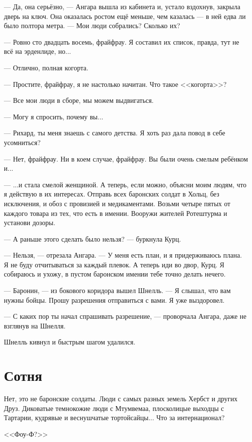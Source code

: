 --- Да, она серьёзно, --- Ангара вышла из кабинета и, устало вздохнув, закрыла дверь на ключ.
Она оказалась ростом ещё меньше, чем казалась --- в ней едва ли было полтора метра.
--- Мои люди собрались?
Сколько их?

--- Ровно сто двадцать восемь, фрайфрау.
Я составил их список, правда, тут не всё на эрденлиде, но...

--- Отлично, полная когорта.

--- Простите, фрайфрау, я не настолько начитан.
Что такое <<когорта>>?

--- Все мои люди в сборе, мы можем выдвигаться.

--- Могу я спросить, почему вы...

--- Рихард, ты меня знаешь с самого детства.
Я хоть раз дала повод в себе усомниться?

--- Нет, фрайфрау.
Ни в коем случае, фрайфрау.
Вы были очень смелым ребёнком и...

--- ...и стала смелой женщиной.
А теперь, если можно, объясни моим людям, что я действую в их интересах.
Отправь всех баронских солдат в Хольц, без исключения, и обоз с провизией и медикаментами.
Возьми четыре пятых от каждого товара из тех, что есть в имении.
Вооружи жителей Ротештурма и установи дозоры.

--- А раньше этого сделать было нельзя? --- буркнула Курц.

--- Нельзя, --- отрезала Ангара.
--- У меня есть план, и я придерживаюсь плана.
Я не буду отчитываться за каждый плевок.
А теперь иди во двор, Курц.
Я собираюсь и ухожу, в пустом баронском имении тебе точно делать нечего.

--- Баронин, --- из бокового коридора вышел Шнелль.
--- Я слышал, что вам нужны бойцы.
Прошу разрешения отправиться с вами.
Я уже выздоровел.

--- С каких пор ты начал спрашивать разрешение, --- проворчала Ангара, даже не взглянув на Шнелля.

Шнелль кивнул и быстрым шагом удалился.

\section{Сотня}

Нет, это не баронские солдаты.
Люди с самых разных земель Хербст и других Друз.
Диковатые темнокожие люди с Мтумвемаа, плосколицые выходцы с Тартарии, кудрявые и веснушчатые тортойсайцы...
Что за интернационал?

<<Фоу-Ф?>>

